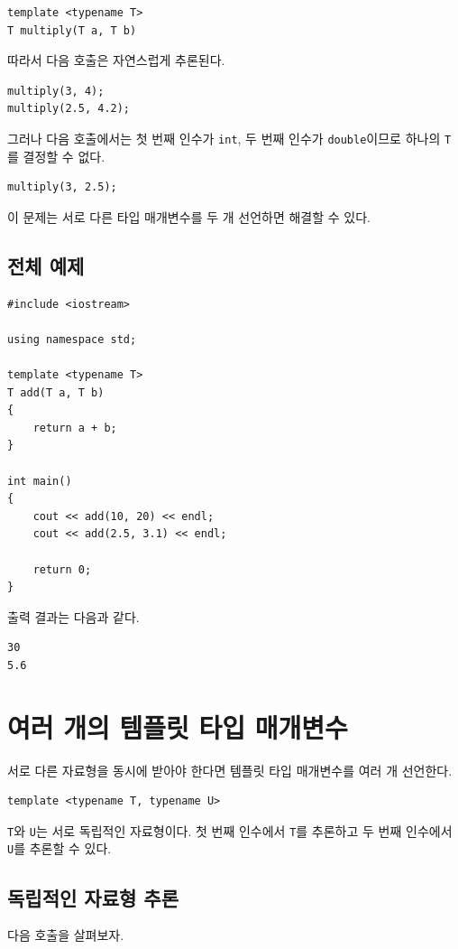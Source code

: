 \documentclass[11pt,a4paper]{article}
\begin{document}
\begin{lstlisting}
template <typename T>
T multiply(T a, T b)
\end{lstlisting}

따라서 다음 호출은 자연스럽게 추론된다.

\begin{lstlisting}
multiply(3, 4);
multiply(2.5, 4.2);
\end{lstlisting}

그러나 다음 호출에서는 첫 번째 인수가 \texttt{int}, 두 번째 인수가 \texttt{double}이므로 하나의 \texttt{T}를 결정할 수 없다.

\begin{lstlisting}
multiply(3, 2.5);
\end{lstlisting}

이 문제는 서로 다른 타입 매개변수를 두 개 선언하면 해결할 수 있다.

\subsection{전체 예제}
\begin{lstlisting}
#include <iostream>

using namespace std;

template <typename T>
T add(T a, T b)
{
    return a + b;
}

int main()
{
    cout << add(10, 20) << endl;
    cout << add(2.5, 3.1) << endl;

    return 0;
}
\end{lstlisting}

출력 결과는 다음과 같다.

\begin{verbatim}
30
5.6
\end{verbatim}

\section{여러 개의 템플릿 타입 매개변수}
서로 다른 자료형을 동시에 받아야 한다면 템플릿 타입 매개변수를 여러 개 선언한다.

\begin{lstlisting}
template <typename T, typename U>
\end{lstlisting}

\texttt{T}와 \texttt{U}는 서로 독립적인 자료형이다. 첫 번째 인수에서 \texttt{T}를 추론하고 두 번째 인수에서 \texttt{U}를 추론할 수 있다.

\subsection{독립적인 자료형 추론}
다음 호출을 살펴보자.
\end{document}
